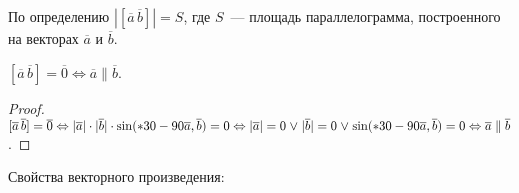 По определению $|[\overline a\,\overline b]| = S$, где $S$~--- площадь параллелограмма, построенного на векторах $\overline a$ и $\overline b$.

\begin{statement}
$[\overline a\,\overline b] = \overline 0 \Leftrightarrow \overline a \parallel \overline b$.
\end{statement}
\begin{proof}
$[\overline a\,\overline b] = \overline 0 \Leftrightarrow
|\overline a| \cdot |\overline b| \cdot \sin (*30-90\overline a, \overline b) = 0 \Leftrightarrow
|\overline a| = 0 \mathrel{\lor} |\overline b| = 0 \mathrel{\lor} \sin (*30-90\overline a, \overline b) = 0 \Leftrightarrow
\overline a \parallel \overline b$.
\end{proof}

Свойства векторного произведения:
